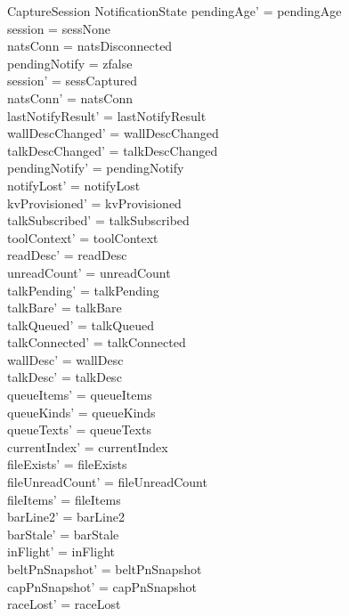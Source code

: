 \documentclass[a4paper,10pt,fleqn]{article}
\begin{document}
\begin{schema}{CaptureSession}
  \Delta NotificationState
  \where
  pendingAge' = pendingAge \\
  session = sessNone \\
  natsConn = natsDisconnected \\
  pendingNotify = zfalse \\
  session' = sessCaptured \\
  natsConn' = natsConn \\
  lastNotifyResult' = lastNotifyResult \\
  wallDescChanged' = wallDescChanged \\
  talkDescChanged' = talkDescChanged \\
  pendingNotify' = pendingNotify \\
  notifyLost' = notifyLost \\
  kvProvisioned' = kvProvisioned \\
  talkSubscribed' = talkSubscribed \\
  toolContext' = toolContext \\
  readDesc' = readDesc \\
  unreadCount' = unreadCount \\
  talkPending' = talkPending \\
  talkBare' = talkBare \\
  talkQueued' = talkQueued \\
  talkConnected' = talkConnected \\
  wallDesc' = wallDesc \\
  talkDesc' = talkDesc \\
  queueItems' = queueItems \\
  queueKinds' = queueKinds \\
  queueTexts' = queueTexts \\
  currentIndex' = currentIndex \\
  fileExists' = fileExists \\
  fileUnreadCount' = fileUnreadCount \\
  fileItems' = fileItems \\
  barLine2' = barLine2 \\
  barStale' = barStale \\
  inFlight' = inFlight \\
  beltPnSnapshot' = beltPnSnapshot \\
  capPnSnapshot' = capPnSnapshot \\
  raceLost' = raceLost \\

\end{schema}
\end{document}
